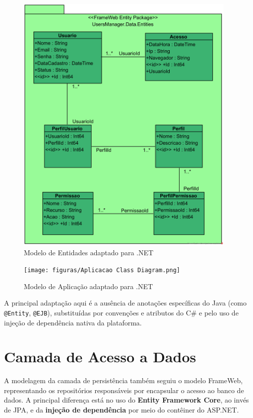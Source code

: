 \begin{figure}[H]
	\centering
	\includegraphics[width=0.95\textwidth]{figuras/Entidades Class Diagram.png}
	\caption{Modelo de Entidades adaptado para .NET}
	\label{fig:modelo-entidades}
\end{figure}

\begin{figure}[H]
	\centering
	\texttt{[image: figuras/Aplicacao Class Diagram.png]}
	\caption{Modelo de Aplicação adaptado para .NET}
	\label{fig:modelo-aplicacao}
\end{figure}

A principal adaptação aqui é a ausência de anotações específicas do Java (como \texttt{@Entity}, \texttt{@EJB}), substituídas por convenções e atributos do C\# e pelo uso de injeção de dependência nativa da plataforma.

\section{Camada de Acesso a Dados}
\label{sec-frameweb-dados}

A modelagem da camada de persistência também seguiu o modelo FrameWeb, representando os repositórios responsáveis por encapsular o acesso ao banco de dados. A principal diferença está no uso do \textbf{Entity Framework Core}, ao invés de JPA, e da \textbf{injeção de dependência} por meio do contêiner do ASP.NET.

